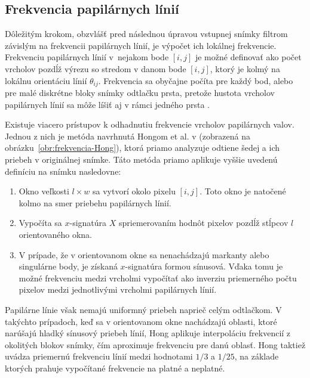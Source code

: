   \subsection{Frekvencia papilárnych línií}
  Dôležitým krokom, obzvlášť pred následnou úpravou vstupnej snímky filtrom závislým na frekvencii papilárnych línií, je výpočet ich lokálnej frekvencie.
  Frekvenciu papilárnych línií v~nejakom bode $[i,j]$ je možné definovať ako počet vrcholov pozdĺž výrezu so stredom v danom bode $[i,j]$,
  ktorý je kolmý na lokálnu orientáciu línií $\theta_{ij}$. Frekvencia sa obyčajne počíta pre každý bod, alebo pre malé diskrétne bloky snímky odtlačku prsta,
  pretože hustota vrcholov papilárnych línií sa môže líšiť aj v rámci jedného prsta \cite{Handbook}.

  Existuje viacero prístupov k odhadnutiu frekvencie vrcholov papilárnych valov. Jednou z nich je metóda navrhnutá Hongom et al. v \cite{Hong} (zobrazená na
  obrázku~{\ref{obr:frekvencia-Hong}}),
  ktorá priamo analyzuje odtiene šedej a ich priebeh v originálnej snímke. Táto metóda priamo aplikuje vyššie uvedenú definíciu na snímku nasledovne:

  \begin{enumerate}
    \item Okno veľkosti $l \times{} w$ sa vytvorí okolo pixelu $[i,j]$. Toto okno je natočené kolmo na smer priebehu papilárnych línií.
    \item Vypočíta sa $x$-signatúra $X$ spriemerovaním hodnôt pixelov pozdĺž stĺpcov $l$ orientovaného okna.
    \item V prípade, že v orientovanom okne sa nenachádzajú markanty alebo singulárne body, je získaná $x$-signatúra formou sínusová. Vďaka tomu je
          možné frekvenciu medzi vrcholmi vypočítať ako inverziu priemerného počtu pixelov medzi jednotlivými vrcholmi papilárnych línií.
  \end{enumerate}
  Papilárne línie však nemajú uniformný priebeh naprieč celým odtlačkom. V takýchto prípadoch, keď sa v orientovanom okne nachádzajú oblasti, ktoré narúšajú
  hladký sínusový priebeh línií, Hong aplikuje interpoláciu frekvencií z okolitých blokov snímky, čím aproximuje frekvenciu pre danú oblasť. Hong taktiež uvádza
  priemernú frekvenciu línií medzi hodnotami $1/3$ a $1/25$, na základe ktorých prahuje vypočítané frekvencie na platné a neplatné.

